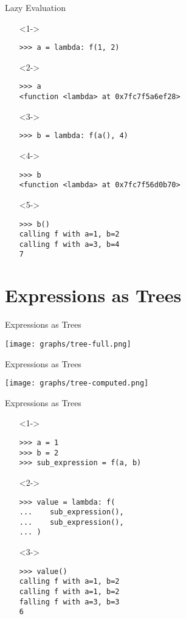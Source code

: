 \documentclass{beamer}
\begin{document}
\begin{frame}[fragile]{Lazy Evaluation}
  \begin{itemize}
  \item[]<1-> \begin{verbatim}
>>> a = lambda: f(1, 2)
    \end{verbatim}
  \item[]<2-> \begin{verbatim}
>>> a
<function <lambda> at 0x7fc7f5a6ef28>
    \end{verbatim}
  \item[]<3-> \begin{verbatim}
>>> b = lambda: f(a(), 4)
    \end{verbatim}
  \item[]<4-> \begin{verbatim}
>>> b
<function <lambda> at 0x7fc7f56d0b70>
    \end{verbatim}
  \item[]<5-> \begin{verbatim}
>>> b()
calling f with a=1, b=2
calling f with a=3, b=4
7
    \end{verbatim}
  \end{itemize}
\end{frame}

\section{Expressions as Trees}

\begin{frame}{Expressions as Trees}
  \begin{center}
    \texttt{[image: graphs/tree-full.png]}
  \end{center}
\end{frame}

\begin{frame}{Expressions as Trees}
  \begin{center}
    \texttt{[image: graphs/tree-computed.png]}
  \end{center}
\end{frame}

\begin{frame}[fragile]{Expressions as Trees}
  \begin{itemize}
    \item[]<1-> \begin{verbatim}
>>> a = 1
>>> b = 2
>>> sub_expression = f(a, b)
    \end{verbatim}
  \item[]<2-> \begin{verbatim}
>>> value = lambda: f(
...    sub_expression(),
...    sub_expression(),
... )
    \end{verbatim}
  \item[]<3-> \begin{verbatim}
>>> value()
calling f with a=1, b=2
calling f with a=1, b=2
falling f with a=3, b=3
6
    \end{verbatim}
  \end{itemize}
\end{frame}
\end{document}
